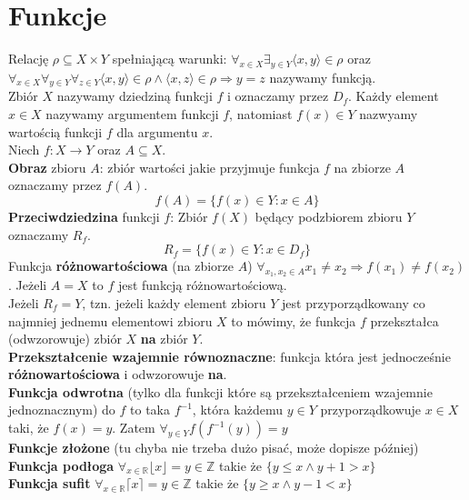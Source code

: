 \documentclass[a4paper,12pt]{article}
\begin{document}
\section{Funkcje}
Relację $\rho \subseteq X \times Y$ spełniającą warunki: $\forall_{x\in X} \exists_{y \in Y} \langle x, y \rangle \in \rho $ oraz $\forall_{x\in X} \forall_{y \in Y} \forall_{z \in Y} \langle x,y \rangle \in \rho \wedge\langle x, z \rangle \in \rho \Rightarrow y=z$ nazywamy funkcją.\\
Zbiór $X$ nazywamy dziedziną funkcji $f$ i oznaczamy przez $D_f$. Każdy element $x \in X$ nazywamy argumentem funkcji $f$, natomiast $f(x)\in Y$ nazwyamy wartością funkcji $f$ dla argumentu $x$. \\

Niech $f:X\rightarrow Y$ oraz $A \subseteq X$.\\
\textbf{Obraz} zbioru $A$: zbiór wartości jakie przyjmuje funkcja $f$ na zbiorze $A$ oznaczamy przez $f(A)$. $$f(A)=\{ f(x)\in Y:x\in A \}$$
\textbf{Przeciwdziedzina} funkcji $f$: Zbiór $f(X)$ będący podzbiorem zbioru $Y$ oznaczamy $R_f$. $$R_f=\{f(x)\in Y: x\in D_f\}$$
Funkcja \textbf{różnowartościowa} (na zbiorze $A$) $\forall_{x_1,x_2\in A} x_1\neq x_2  \Rightarrow f(x_1)\neq f(x_2)$. Jeżeli $A=X$ to $f$ jest funkcją różnowartościową.\\
Jeżeli $R_f=Y$, tzn. jeżeli każdy element zbioru $Y$ jest przyporządkowany co najmniej jednemu elementowi zbioru $X$ to mówimy, że funkcja $f$ przekształca (odwzorowuje) zbiór $X$ \textbf{na} zbiór $Y$.\\
\textbf{Przekształcenie wzajemnie równoznaczne}: funkcja która jest jednocześnie \textbf{różnowartościowa} i odwzorowuje \textbf{na}.\\
\textbf{Funkcja odwrotna} (tylko dla funkcji które są przekształceniem wzajemnie jednoznacznym) do $f$ to taka $f^{-1}$, która każdemu $y\in Y$ przyporządkowuje $x \in X$ taki, że $f(x)=y$. Zatem $\forall_{y\in Y} f(f^{-1}(y))=y$ \\
\textbf{Funkcje złożone} (tu chyba nie trzeba dużo pisać, może dopisze później) \\
\textbf{Funkcja podłoga} $\forall_{x\in \mathbb{R}} \lfloor x \rfloor=y\in \mathbb{Z}$ takie że $\{ y\leq x \wedge y+1>x \}$ \\
\textbf{Funkcja sufit} $\forall_{x\in \mathbb{R}} \lceil x \rceil=y\in \mathbb{Z}$ takie że $\{ y\geq x \wedge y-1<x \}$
\end{document}
